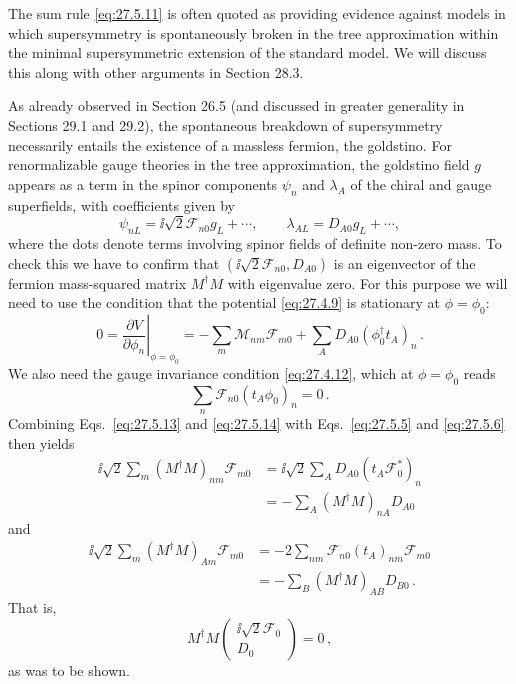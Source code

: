 The sum rule \eqref{eq:27.5.11} is often quoted as providing evidence
against models in which supersymmetry is spontaneously broken in the tree
approximation within the minimal supersymmetric extension of the standard
model. We will discuss this along with other arguments in Section 28.3.

As already observed in Section 26.5 (and discussed in greater generality in
Sections 29.1 and 29.2), the spontaneous breakdown of supersymmetry
necessarily entails the existence of a massless fermion, the goldstino. For
renormalizable gauge theories in the tree approximation, the goldstino field
\(g\) appears as a term in the spinor components \(\psi_n\) and \(\lambda_A\)
of the chiral and gauge superfields, with coefficients given by
\begin{equation}
  \psi_{nL}=\ii\sqrt{2}\mathcal{F}_{n0}g_L+\cdots,
  \qquad
  \lambda_{AL}=D_{A0}g_L+\cdots,
  \tag{27.5.12}\label{eq:27.5.12}
\end{equation}
where the dots denote terms involving spinor fields of definite non-zero
mass. To check this we have to confirm that
\((\ii\sqrt{2}\mathcal{F}_{n0},D_{A0})\) is an eigenvector of the fermion
mass-squared matrix \(M^\dagger M\) with eigenvalue zero. For this purpose we
will need to use the condition that the potential \eqref{eq:27.4.9} is
stationary at \(\phi=\phi_0\):
\begin{equation}
  0
  =\left.\frac{\partial V}{\partial\phi_n}\right|_{\phi=\phi_0}
  =-\sum_m\mathcal{M}_{nm}\mathcal{F}_{m0}
  +\sum_A D_{A0}(\phi_0^\dagger t_A)_n\,.
  \tag{27.5.13}\label{eq:27.5.13}
\end{equation}
We also need the gauge invariance condition \eqref{eq:27.4.12}, which at
\(\phi=\phi_0\) reads
\begin{equation}
  \sum_n\mathcal{F}_{n0}(t_A\phi_0)_n=0\,.
  \tag{27.5.14}\label{eq:27.5.14}
\end{equation}
Combining Eqs.~\eqref{eq:27.5.13} and \eqref{eq:27.5.14} with
Eqs.~\eqref{eq:27.5.5} and \eqref{eq:27.5.6} then yields
\begin{equation}
  \begin{aligned}
  \ii\sqrt{2}\sum_m(M^\dagger M)_{nm}\mathcal{F}_{m0}
  &=\ii\sqrt{2}\sum_A D_{A0}(t_A\mathcal{F}_0^*)_n
  \\
  &=-\sum_A(M^\dagger M)_{nA}D_{A0}
  \end{aligned}
  \tag{27.5.15}\label{eq:27.5.15}
\end{equation}
and
\begin{equation}
  \begin{aligned}
  \ii\sqrt{2}\sum_m(M^\dagger M)_{Am}\mathcal{F}_{m0}
  &=-2\sum_{nm}\mathcal{F}_{n0}(t_A)_{nm}\mathcal{F}_{m0}
  \\
  &=-\sum_B(M^\dagger M)_{AB}D_{B0}\,.
  \end{aligned}
  \tag{27.5.16}\label{eq:27.5.16}
\end{equation}
That is,
\begin{equation}
  M^\dagger M
  \begin{pmatrix}
    \ii\sqrt{2}\mathcal{F}_0\\
    D_0
  \end{pmatrix}
  =0\,,
  \tag{27.5.17}\label{eq:27.5.17}
\end{equation}
as was to be shown.
